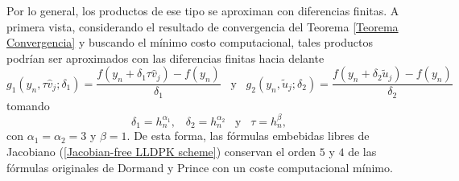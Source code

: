 Por lo general, los productos de ese tipo se aproximan con diferencias finitas. A primera vista, considerando el resultado de convergencia del Teorema \ref{Teorema Convergencia} y buscando el mínimo costo computacional, tales productos podrían ser aproximados con las diferencias finitas hacia delante
\begin{equation}
	g_1(y_n,\tau \widehat{v}_j;\delta_1)=\frac{f(y_n+\delta_1 \tau \widehat{v}_j)-f(y_n)}{\delta_1}  \;\;\; \text{y} \;\;\; g_2(y_n,\widetilde{u}_j;\delta_2)=\frac{f(y_n+\delta_2  \widetilde{u}_j)-f(y_n)}{\delta_2} \label{FDO1}
 \end{equation}
tomando
\begin{equation}\label{deltaconstraint}
	\delta_1 = h_n^{\alpha_1}, \;\;\;  \delta_2 = h_n^{\alpha_2} \;\;\; \text{y} \;\;\; \tau=h_n^{\beta},
\end{equation}
con $\alpha_1=\alpha_2=3$ y $\beta=1$. De esta forma, las fórmulas embebidas libres de Jacobiano (\ref{Jacobian-free LLDPK scheme}) conservan el orden $5$ y $4$ de las fórmulas originales de Dormand y Prince con un coste computacional mínimo.


